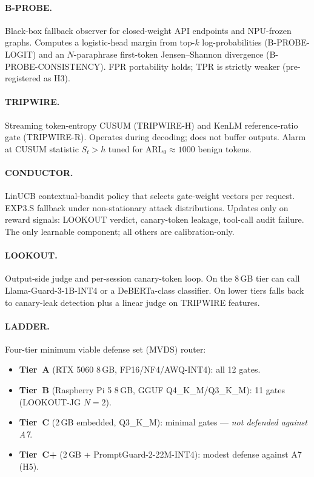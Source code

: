 \documentclass[11pt,a4paper]{article}
\begin{document}
\paragraph{B-PROBE.}
Black-box fallback observer for closed-weight API endpoints and NPU-frozen graphs.
Computes a logistic-head margin from top-$k$ log-probabilities (B-PROBE-LOGIT)
and an $N$-paraphrase first-token Jensen--Shannon divergence
(B-PROBE-CONSISTENCY).
FPR portability holds; TPR is strictly weaker (pre-registered as H3).

\paragraph{TRIPWIRE.}
Streaming token-entropy CUSUM (TRIPWIRE-H) and KenLM reference-ratio gate
(TRIPWIRE-R). Operates during decoding; does not buffer outputs.
Alarm at CUSUM statistic $S_t > h$ tuned for $\mathrm{ARL}_0 \approx 1000$
benign tokens.

\paragraph{CONDUCTOR.}
LinUCB \citep{li2010contextual} contextual-bandit policy that selects
gate-weight vectors per request.
EXP3.S fallback under non-stationary attack distributions.
Updates only on reward signals: LOOKOUT verdict, canary-token leakage,
tool-call audit failure.
The only learnable component; all others are calibration-only.

\paragraph{LOOKOUT.}
Output-side judge and per-session canary-token loop.
On the 8\,GB tier can call Llama-Guard-3-1B-INT4 or a DeBERTa-class classifier.
On lower tiers falls back to canary-leak detection plus a linear judge on
TRIPWIRE features.

\paragraph{LADDER.}
Four-tier minimum viable defense set (MVDS) router:
\begin{itemize}[itemsep=1pt]
  \item \textbf{Tier~A} (RTX 5060 8\,GB, FP16/NF4/AWQ-INT4): all 12 gates.
  \item \textbf{Tier~B} (Raspberry Pi 5 8\,GB, GGUF Q4\_K\_M/Q3\_K\_M):
        11 gates (LOOKOUT-JG $N=2$).
  \item \textbf{Tier~C} (2\,GB embedded, Q3\_K\_M): minimal gates ---
        \emph{not defended against A7}.
  \item \textbf{Tier~C+} (2\,GB + PromptGuard-2-22M-INT4): modest defense
        against A7 (H5).
\end{itemize}
\end{document}

